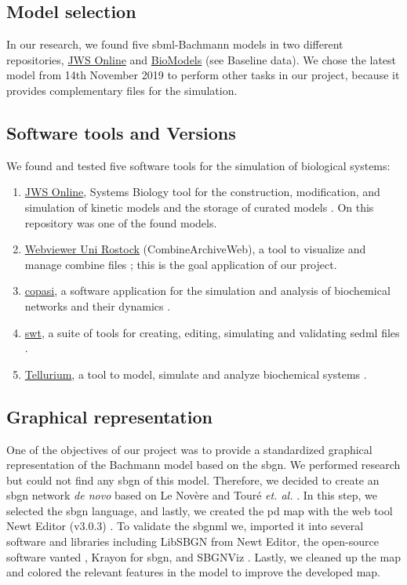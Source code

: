 \subsection*{Model selection}
In our research, we found five \ac{sbml}-Bachmann models in two different repositories, \hyperlink{https://www.systemsmedicine.net/posts/jws-online-biological-systems-modelling}{JWS Online} and \hyperlink{https://www.ebi.ac.uk/biomodels/}{BioModels} (see Baseline data). We chose the latest model from 14th November 2019 to perform other tasks in our project, because it provides complementary files for the simulation.

\subsection*{Software tools and Versions}
We found and tested five software tools for the simulation of biological systems:
\begin{enumerate} 
    \item \hyperlink{https://www.systemsmedicine.net/posts/jws-online-biological-systems-modelling}{JWS Online}, Systems Biology tool for the construction, modification, and simulation of kinetic models and the storage of curated models \cite{jwsonline}. On this repository was one of the found models.
    \item \hyperlink{https://cat.bio.informatik.uni-rostock.de/}{Webviewer Uni Rostock} (CombineArchiveWeb), a tool to visualize and manage \ac{combine} files \cite{combine}; this is the goal application of our project. 
    \item \hyperlink{http://copasi.org/}{\ac{copasi}}, a software application for the simulation and analysis of biochemical networks and their dynamics \cite{copasi}.
    \item \hyperlink{https://sed-ml.org/}{\ac{swt}}, a suite of tools for creating, editing, simulating and validating \ac{sedml} files \cite{sedml}. 
    \item \hyperlink{https://tellurium.readthedocs.io/en/latest/}{Tellurium},  a tool to model, simulate and analyze biochemical systems \cite{tellurium}.
\end{enumerate}

\subsection*{Graphical representation}
One of the objectives of our project was to provide a standardized graphical representation of the Bachmann model based on the \ac{sbgn}. We performed research but could not find any \ac{sbgn} of this model. Therefore, we decided to create an \ac{sbgn} network \textit{de novo} based on Le Novère \cite{sbgnnovere} and Touré \textit{et. al.} \cite{sbgntoure}. In this step, we selected the \ac{sbgn} language, and lastly, we created the \ac{pd} map with the web tool Newt Editor (v3.0.3) \cite{newteditor}. To validate the \ac{sbgnml} we, imported it into several software and libraries including LibSBGN from Newt Editor, the open-source software \ac{vanted} \cite{vanted}, Krayon for \ac{sbgn}\cite{krayon}, and SBGNViz \cite{sbgnviz}. Lastly, we cleaned up the map and colored the relevant features in the model to improve the developed map.

